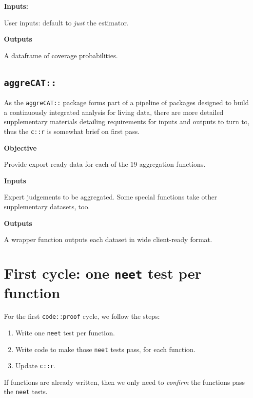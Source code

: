 \documentclass[
]{article}
\providecommand{\tightlist}{%
  \setlength{\itemsep}{0pt}\setlength{\parskip}{0pt}}
\begin{document}
\textbf{Inputs:}

User inputs: default to \emph{just} the estimator.

\textbf{Outputs}

A dataframe of coverage probabilities.

\hypertarget{aggrecat}{%
\subsection{\texorpdfstring{\texttt{aggreCAT::}}{aggreCAT::}}\label{aggrecat}}

As the \texttt{aggreCAT::} package forms part of a pipeline of packages designed to build a continuously integrated analysis for living data, there are more detailed supplementary materials detailing requirements for inputs and outputs to turn to, thus the \texttt{c::r} is somewhat brief on first pass.

\textbf{Objective}

Provide export-ready data for each of the 19 aggregation functions.

\textbf{Inputs}

Expert judgements to be aggregated. Some special functions take other supplementary datasets, too.

\textbf{Outputs}

A wrapper function outputs each dataset in wide client-ready format.

\hypertarget{first-cycle-one-neet-test-per-function}{%
\section{\texorpdfstring{First cycle: one \texttt{neet} test per function}{First cycle: one neet test per function}}\label{first-cycle-one-neet-test-per-function}}

For the first \texttt{code::proof} cycle, we follow the steps:

\begin{enumerate}
\def\labelenumi{\arabic{enumi}.}
\tightlist
\item
  Write one \texttt{neet} test per function.
\item
  Write code to make those \texttt{neet} tests pass, for each function.
\item
  Update \texttt{c::r}.
\end{enumerate}

If functions are already written, then we only need to \emph{confirm} the functions pass the \texttt{neet} tests.
\end{document}
